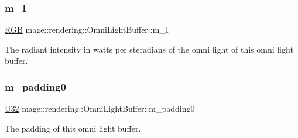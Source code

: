 \subsubsection{\texorpdfstring{m\+\_\+I}{m\_I}}
{\footnotesize\ttfamily \mbox{\hyperlink{structmage_1_1_r_g_b}{R\+GB}} mage\+::rendering\+::\+Omni\+Light\+Buffer\+::m\+\_\+I}

The radiant intensity in watts per steradians of the omni light of this omni light buffer. \mbox{\label{structmage_1_1rendering_1_1_omni_light_buffer_a3b440492e1a9fc48c6f109e5787aa4c7}} 
\subsubsection{\texorpdfstring{m\+\_\+padding0}{m\_padding0}}
{\footnotesize\ttfamily \mbox{\hyperlink{namespacemage_aa5d6eaabaac3cdd01873d6a3d27e90f3}{U32}} mage\+::rendering\+::\+Omni\+Light\+Buffer\+::m\+\_\+padding0}

The padding of this omni light buffer. 